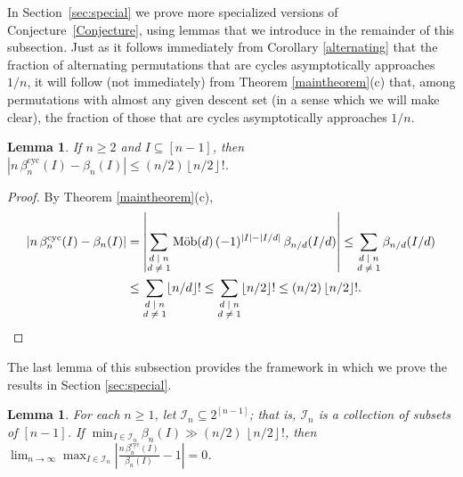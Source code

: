\documentclass[12pt]{article}
\newcommand{\betacyc}{\beta^{\text{cyc}}}
\DeclareMathOperator{\mob}{M\ddot{o}b}
\newtheorem{lem}[thm]{Lemma}
\theoremstyle{definition}
\begin{document}
In Section~\ref{sec:special} we prove more specialized versions of Conjecture~\ref{Conjecture}, using lemmas that we introduce in the remainder of this subsection. 
Just as it follows immediately from Corollary \ref{alternating} that the fraction of alternating permutations that are cycles asymptotically approaches $1/n$, it will follow (not immediately) from Theorem \ref{maintheorem}(c) that, among permutations with almost any given descent set (in a sense which we will make clear), the fraction of those that are cycles asymptotically approaches $1/n$.


\begin{lem} \label{bound2}
If $n \ge 2$ and $I \subseteq [n-1]$, then $\left|n\,\betacyc_n(I) - \beta_n(I) \right| \le (n/2)\left\lfloor n/2 \right\rfloor!$.
\end{lem}

\begin{proof}
By Theorem \ref{maintheorem}(c),
\begin{align*}
\left|n\,\betacyc_n(I) - \beta_n(I) \right| &= \left| \sum_{\substack{\text{$d \mid n$}\\\text{$d\not=1$}}} \mob(d)\,(-1)^{|I|-|I/d|}\,\beta_{n/d}(I/d) \right| \le \sum_{\substack{\text{$d \mid n$}\\\text{$d\not=1$}}} \beta_{n/d}(I/d) \\
&\le \sum_{\substack{\text{$d \mid n$}\\\text{$d\not=1$}}} \lfloor n/d \rfloor !  \le \sum_{\substack{\text{$d \mid n$}\\\text{$d\not=1$}}} \lfloor n/2 \rfloor ! \le (n/2)\,\lfloor n/2 \rfloor !. \qedhere
\end{align*}\end{proof}

The last lemma of this subsection provides the framework in which we prove the results in Section \ref{sec:special}. 

\begin{lem} \label{framework} For each $n\ge1$, let $\mathcal{I}_n \subseteq 2^{[n-1]}$; that is, $\mathcal{I}_n$ is a collection of subsets of $[n-1]$. If $\min_{I \in \mathcal{I}_n} \beta_n(I) \gg (n/2)\,\left\lfloor n/2\right\rfloor!$, then $\lim_{n\to\infty} \max_{I \in \mathcal{I}_n} \left|\frac{n\,\betacyc_n(I)}{\beta_n(I)} - 1\right| = 0$.
\end{lem}
\end{document}
